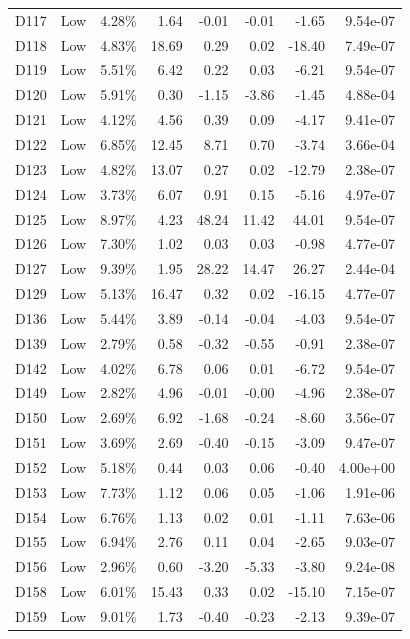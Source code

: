 \begin{tabular}{l l r r r r r r}
D117 & Low & 4.28\% & 1.64 & -0.01 & -0.01 & -1.65 & 9.54e-07 \\
D118 & Low & 4.83\% & 18.69 & 0.29 & 0.02 & -18.40 & 7.49e-07 \\
D119 & Low & 5.51\% & 6.42 & 0.22 & 0.03 & -6.21 & 9.54e-07 \\
D120 & Low & 5.91\% & 0.30 & -1.15 & -3.86 & -1.45 & 4.88e-04 \\
D121 & Low & 4.12\% & 4.56 & 0.39 & 0.09 & -4.17 & 9.41e-07 \\
D122 & Low & 6.85\% & 12.45 & 8.71 & 0.70 & -3.74 & 3.66e-04 \\
D123 & Low & 4.82\% & 13.07 & 0.27 & 0.02 & -12.79 & 2.38e-07 \\
D124 & Low & 3.73\% & 6.07 & 0.91 & 0.15 & -5.16 & 4.97e-07 \\
D125 & Low & 8.97\% & 4.23 & 48.24 & 11.42 & 44.01 & 9.54e-07 \\
D126 & Low & 7.30\% & 1.02 & 0.03 & 0.03 & -0.98 & 4.77e-07 \\
D127 & Low & 9.39\% & 1.95 & 28.22 & 14.47 & 26.27 & 2.44e-04 \\
D129 & Low & 5.13\% & 16.47 & 0.32 & 0.02 & -16.15 & 4.77e-07 \\
D136 & Low & 5.44\% & 3.89 & -0.14 & -0.04 & -4.03 & 9.54e-07 \\
D139 & Low & 2.79\% & 0.58 & -0.32 & -0.55 & -0.91 & 2.38e-07 \\
D142 & Low & 4.02\% & 6.78 & 0.06 & 0.01 & -6.72 & 9.54e-07 \\
D149 & Low & 2.82\% & 4.96 & -0.01 & -0.00 & -4.96 & 2.38e-07 \\
D150 & Low & 2.69\% & 6.92 & -1.68 & -0.24 & -8.60 & 3.56e-07 \\
D151 & Low & 3.69\% & 2.69 & -0.40 & -0.15 & -3.09 & 9.47e-07 \\
D152 & Low & 5.18\% & 0.44 & 0.03 & 0.06 & -0.40 & 4.00e+00 \\
D153 & Low & 7.73\% & 1.12 & 0.06 & 0.05 & -1.06 & 1.91e-06 \\
D154 & Low & 6.76\% & 1.13 & 0.02 & 0.01 & -1.11 & 7.63e-06 \\
D155 & Low & 6.94\% & 2.76 & 0.11 & 0.04 & -2.65 & 9.03e-07 \\
D156 & Low & 2.96\% & 0.60 & -3.20 & -5.33 & -3.80 & 9.24e-08 \\
D158 & Low & 6.01\% & 15.43 & 0.33 & 0.02 & -15.10 & 7.15e-07 \\
D159 & Low & 9.01\% & 1.73 & -0.40 & -0.23 & -2.13 & 9.39e-07 \\

\end{tabular}

